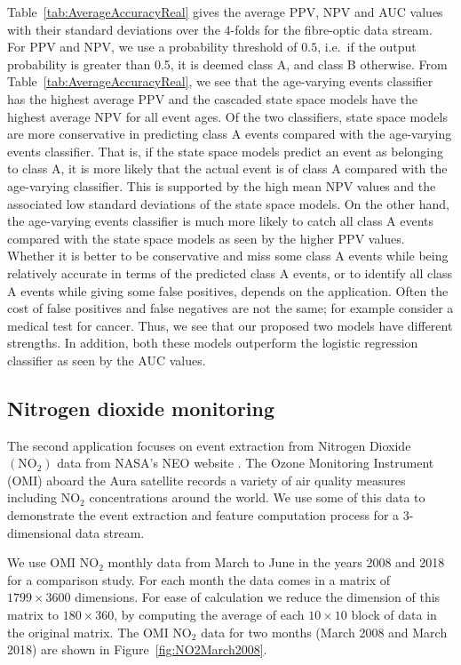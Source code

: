 \documentclass[a4paper,11pt]{article}
\begin{document}
Table~\ref{tab:AverageAccuracyReal} gives the average PPV, NPV and AUC values with their standard deviations over the $4$-folds for the fibre-optic data stream. For PPV and NPV, we use a probability threshold of $0.5$, i.e.\ if the output probability is greater than 0.5, it is deemed class A, and class B otherwise. From Table~\ref{tab:AverageAccuracyReal}, we see that the age-varying events classifier has the highest average PPV and the cascaded state space models have the highest average NPV for all event ages. Of the two classifiers, state space models are more conservative in predicting class A events compared with the age-varying events classifier. That is, if the state space models predict an event as belonging to class A, it is more likely that the actual event is of class A compared with the age-varying classifier. This is supported by the high mean NPV values and the associated low standard deviations of the state space models. On the other hand, the age-varying events classifier is much more likely to catch all class A events compared with the state space models as seen by the higher PPV values. Whether it is better to be conservative and miss some class A events while being relatively accurate in terms of the predicted class A events, or to identify all class A events while giving some false positives, depends on the application. Often the cost of  false positives and false negatives are not the same; for example consider a medical test for cancer. Thus, we see that our proposed two models have different strengths. In addition, both these models outperform the logistic regression classifier as seen by the AUC values.

\subsection{Nitrogen dioxide monitoring}\label{sec:NO2Exp}

The second application focuses on event extraction from Nitrogen Dioxide $(\text{NO}_2)$ data from NASA's NEO website \citep{OMINO2}. The Ozone Monitoring Instrument (OMI) \citep{levelt2006ozone} aboard the Aura satellite records a variety of air quality measures including $\text{NO}_2$ concentrations around the world. We use some of this data to demonstrate the event extraction and feature computation process for a 3-dimensional data stream.

We use OMI $\text{NO}_2$ monthly data from March to June in the years 2008 and 2018 for a comparison study. For each month the data comes in a matrix of $1799 \times 3600$ dimensions. For ease of calculation we reduce the dimension of this matrix to $180 \times 360 $, by computing the average of each $10 \times 10$ block of data in the original matrix. The OMI $\text{NO}_2$ data for two months (March 2008 and March 2018) are shown in Figure~\ref{fig:NO2March2008}.
\end{document}
